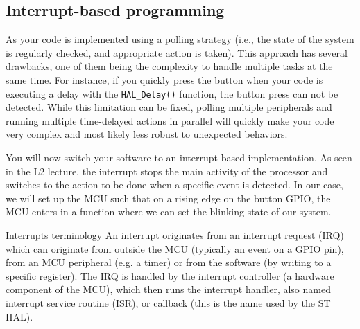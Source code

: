 


\subsection{Interrupt-based programming}

As your code is implemented using a polling strategy (i.e., the state of the system is regularly checked, and appropriate action is taken). This approach has several drawbacks, one of them being the complexity to handle multiple tasks at the same time. For instance, if you quickly press the button when your code is executing a delay with the \texttt{HAL\_Delay()} function, the button press can not be detected. While this limitation can be fixed, polling multiple peripherals and running multiple time-delayed actions in parallel will quickly make your code very complex and most likely less robust to unexpected behaviors.

You will now switch your software to an interrupt-based implementation. As seen in the L2 lecture, the interrupt stops the main activity of the processor and switches to the action to be done when a specific event is detected. In our case, we will set up the MCU such that on a rising edge on the button GPIO, the MCU enters in a function where we can set the blinking state of our system.

\begin{bclogo}[couleur = gray!20, arrondi = 0.2, logo=\bcinfo]{Interrupts terminology}
An interrupt originates from an interrupt request (IRQ) which can originate from outside the MCU (typically an event on a GPIO pin), from an MCU peripheral (e.g. a timer) or from the software (by writing to a specific register). The IRQ is handled by the interrupt controller (a hardware component of the MCU), which then runs the interrupt handler, also named interrupt service routine (ISR), or callback (this is the name used by the ST HAL).
\end{bclogo}

